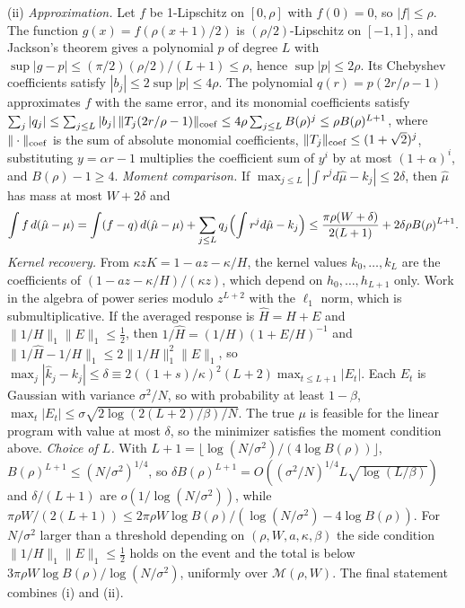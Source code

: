 (ii) \emph{Approximation.} Let $f$ be 1-Lipschitz on $[0,\rho]$ with $f(0)=0$, so $|f|\le\rho$. The function $g(x)=f(\rho(x+1)/2)$ is $(\rho/2)$-Lipschitz on $[-1,1]$, and Jackson's theorem \citep{p1:rivlin1981} gives a polynomial $p$ of degree $L$ with $\sup|g-p|\le(\pi/2)(\rho/2)/(L+1)\le\rho$, hence $\sup|p|\le2\rho$. Its Chebyshev coefficients satisfy $|b_j|\le2\sup|p|\le4\rho$. The polynomial $q(r)=p(2r/\rho-1)$ approximates $f$ with the same error, and its monomial coefficients satisfy $\sum_j|q_j|\le\sum_{j\le L}|b_j|\,\|T_j(2r/\rho-1)\|_{\rm coef}\le4\rho\sum_{j\le L}B(\rho)^j\le\rho B(\rho)^{L+1}$, where $\|\cdot\|_{\rm coef}$ is the sum of absolute monomial coefficients, $\|T_j\|_{\rm coef}\le(1+\sqrt2)^j$, substituting $y=\alpha r-1$ multiplies the coefficient sum of $y^i$ by at most $(1+\alpha)^i$, and $B(\rho)-1\ge4$. \emph{Moment comparison.} If $\max_{j\le L}|\int r^jd\hat\mu-k_j|\le2\delta$, then $\hat\mu$ has mass at most $W+2\delta$ and
\[
\int f\,d(\hat\mu-\mu)=\int(f-q)\,d(\hat\mu-\mu)+\sum_{j\le L}q_j\Bigl(\int r^jd\hat\mu-k_j\Bigr)\le\frac{\pi\rho(W+\delta)}{2(L+1)}+2\delta\rho B(\rho)^{L+1}.
\]
\emph{Kernel recovery.} From $\kappa zK=1-az-\kappa/H$, the kernel values $k_0,\ldots,k_L$ are the coefficients of $(1-az-\kappa/H)/(\kappa z)$, which depend on $h_0,\ldots,h_{L+1}$ only. Work in the algebra of power series modulo $z^{L+2}$ with the $\ell_1$ norm, which is submultiplicative. If the averaged response is $\hat H=H+E$ and $\|1/H\|_1\|E\|_1\le\tfrac12$, then $1/\hat H=(1/H)(1+E/H)^{-1}$ and $\|1/\hat H-1/H\|_1\le2\|1/H\|_1^2\|E\|_1$, so $\max_j|\hat k_j-k_j|\le\delta\equiv2((1+s)/\kappa)^2(L+2)\max_{t\le L+1}|E_t|$. Each $E_t$ is Gaussian with variance $\sigma^2/N$, so with probability at least $1-\beta$, $\max_t|E_t|\le\sigma\sqrt{2\log(2(L+2)/\beta)/N}$. The true $\mu$ is feasible for the linear program with value at most $\delta$, so the minimizer satisfies the moment condition above. \emph{Choice of $L$.} With $L+1=\lfloor\log(N/\sigma^2)/(4\log B(\rho))\rfloor$, $B(\rho)^{L+1}\le(N/\sigma^2)^{1/4}$, so $\delta B(\rho)^{L+1}=O((\sigma^2/N)^{1/4}L\sqrt{\log(L/\beta)})$ and $\delta/(L+1)$ are $o(1/\log(N/\sigma^2))$, while $\pi\rho W/(2(L+1))\le2\pi\rho W\log B(\rho)/(\log(N/\sigma^2)-4\log B(\rho))$. For $N/\sigma^2$ larger than a threshold depending on $(\rho,W,a,\kappa,\beta)$ the side condition $\|1/H\|_1\|E\|_1\le\frac12$ holds on the event and the total is below $3\pi\rho W\log B(\rho)/\log(N/\sigma^2)$, uniformly over $\mathcal M(\rho,W)$. The final statement combines (i) and (ii).

